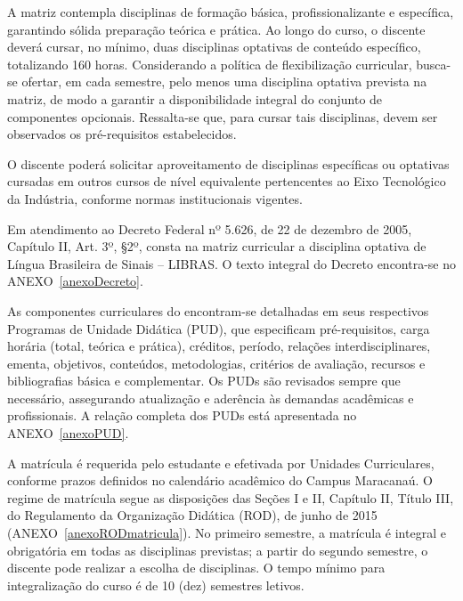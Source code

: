 A matriz contempla disciplinas de formação básica, profissionalizante e específica, garantindo sólida preparação teórica e prática. Ao longo do curso, o discente deverá cursar, no mínimo, duas disciplinas optativas de conteúdo específico, totalizando 160 horas. Considerando a política de flexibilização curricular, busca-se ofertar, em cada semestre, pelo menos uma disciplina optativa prevista na matriz, de modo a garantir a disponibilidade integral do conjunto de componentes opcionais. Ressalta-se que, para cursar tais disciplinas, devem ser observados os pré-requisitos estabelecidos.

O discente poderá solicitar aproveitamento de disciplinas específicas ou optativas cursadas em outros cursos de nível equivalente pertencentes ao Eixo Tecnológico da Indústria, conforme normas institucionais vigentes.

Em atendimento ao Decreto Federal nº 5.626, de 22 de dezembro de 2005, Capítulo II, Art. 3º, §2º, consta na matriz curricular a disciplina optativa de Língua Brasileira de Sinais – LIBRAS. O texto integral do Decreto encontra-se no ANEXO~\ref{anexoDecreto}.

As componentes curriculares do \NOMECURSO encontram-se detalhadas em seus respectivos Programas de Unidade Didática (PUD), que especificam pré-requisitos, carga horária (total, teórica e prática), créditos, período, relações interdisciplinares, ementa, objetivos, conteúdos, metodologias, critérios de avaliação, recursos e bibliografias básica e complementar. Os PUDs são revisados sempre que necessário, assegurando atualização e aderência às demandas acadêmicas e profissionais. A relação completa dos PUDs está apresentada no ANEXO~\ref{anexoPUD}.

A matrícula é requerida pelo estudante e efetivada por Unidades Curriculares, conforme prazos definidos no calendário acadêmico do Campus Maracanaú. O regime de matrícula segue as disposições das Seções I e II, Capítulo II, Título III, do Regulamento da Organização Didática (ROD), de junho de 2015 (ANEXO~\ref{anexoRODmatricula}). No primeiro semestre, a matrícula é integral e obrigatória em todas as disciplinas previstas; a partir do segundo semestre, o discente pode realizar a escolha de disciplinas. O tempo mínimo para integralização do curso é de 10 (dez) semestres letivos.

\begin{destacar}
\end{destacar}


